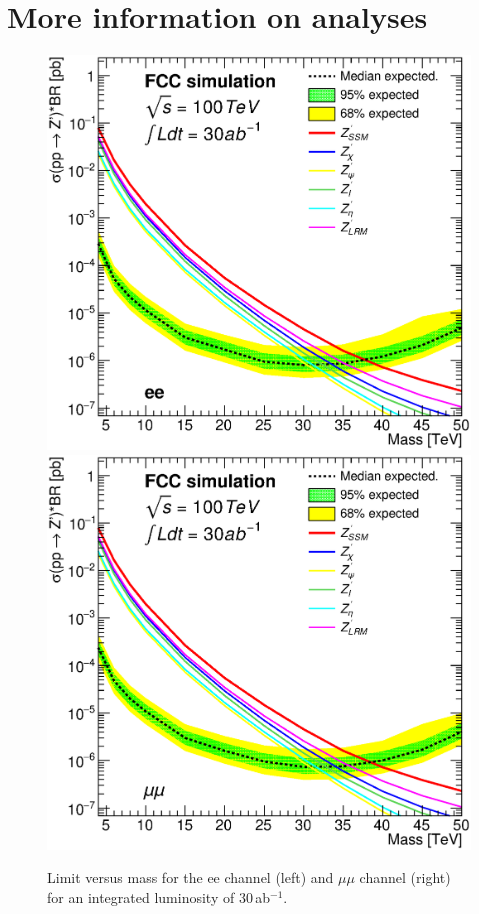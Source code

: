 \documentclass[a4paper,11pt]{article}
\begin{document}
\section{More information on analyses}
\label{app:anamore}
\begin{figure}[!htb]
  \centering
  \includegraphics[width=0.35\columnwidth]{Fig/lim_Zprime_ee_fcc_v02_allxs.eps}
  \includegraphics[width=0.35\columnwidth]{Fig/lim_Zprime_mumu_fcc_v02_allxs.eps}
  \caption{Limit versus mass for the ee channel (left) and $\mu\mu$ channel (right) for an integrated luminosity of $30$\,ab$^{-1}$. }
  \label{figure:leptonicresonances:resultseemumu}
\end{figure}


\end{document}
